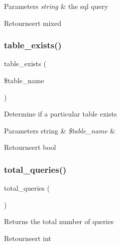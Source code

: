 \begin{DoxyParams}{Parameters}
{\em string} & the sql query \\
\hline
\end{DoxyParams}
\begin{DoxyReturn}{Retourneert}
mixed 
\end{DoxyReturn}
\mbox{\label{class_c_i___d_b__driver_af148cb2cd5d490d2a480c0c741ceed03}} 
\subsubsection{\texorpdfstring{table\_exists()}{table\_exists()}}
{\footnotesize\ttfamily table\+\_\+exists (\begin{DoxyParamCaption}\item[{}]{\$table\+\_\+name }\end{DoxyParamCaption})}

Determine if a particular table exists


\begin{DoxyParams}[1]{Parameters}
string & {\em \$table\+\_\+name} & \\
\hline
\end{DoxyParams}
\begin{DoxyReturn}{Retourneert}
bool 
\end{DoxyReturn}
\mbox{\label{class_c_i___d_b__driver_a8fc0b6551e1ca0c68c6e3a66b27310fc}} 
\subsubsection{\texorpdfstring{total\_queries()}{total\_queries()}}
{\footnotesize\ttfamily total\+\_\+queries (\begin{DoxyParamCaption}{ }\end{DoxyParamCaption})}

Returns the total number of queries

\begin{DoxyReturn}{Retourneert}
int 
\end{DoxyReturn}
\mbox{\label{class_c_i___d_b__driver_a90e153cf190d273336d77cce930587e1}} 

